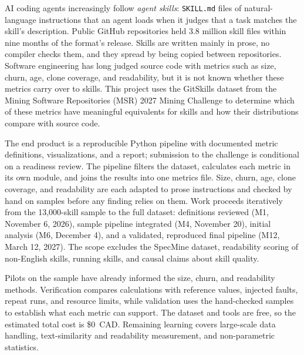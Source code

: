 
AI coding agents increasingly follow \emph{agent skills}: \texttt{SKILL.md} files of natural-language instructions that an agent loads when it judges that a task matches the skill's description. Public GitHub repositories held 3.8 million skill files within nine months of the format's release. Skills are written mainly in prose, no compiler checks them, and they spread by being copied between repositories. Software engineering has long judged source code with metrics such as size, churn, age, clone coverage, and readability, but it is not known whether these metrics carry over to skills. This project uses the GitSkills dataset from the Mining Software Repositories (MSR) 2027 Mining Challenge to determine which of these metrics have meaningful equivalents for skills and how their distributions compare with source code.

The end product is a reproducible Python pipeline with documented metric definitions, visualizations, and a report; submission to the challenge is conditional on a readiness review. The pipeline filters the dataset, calculates each metric in its own module, and joins the results into one metrics file. Size, churn, age, clone coverage, and readability are each adapted to prose instructions and checked by hand on samples before any finding relies on them. Work proceeds iteratively from the 13,000-skill sample to the full dataset: definitions reviewed (M1, November 6, 2026), sample pipeline integrated (M4, November 20), initial analysis (M6, December 4), and a validated, reproduced final pipeline (M12, March 12, 2027). The scope excludes the SpecMine dataset, readability scoring of non-English skills, running skills, and causal claims about skill quality.

Pilots on the sample have already informed the size, churn, and readability methods. Verification compares calculations with reference values, injected faults, repeat runs, and resource limits, while validation uses the hand-checked samples to establish what each metric can support. The dataset and tools are free, so the estimated total cost is \$0~CAD. Remaining learning covers large-scale data handling, text-similarity and readability measurement, and non-parametric statistics.

\clearpage
